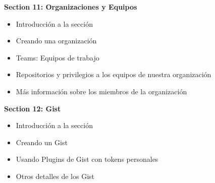 \documentclass[
]{book}
\providecommand{\tightlist}{%
  \setlength{\itemsep}{0pt}\setlength{\parskip}{0pt}}
\begin{document}
\textbf{Section 11: Organizaciones y Equipos}

\begin{itemize}
\tightlist
\item
  Introducción a la sección
\item
  Creando una organización
\item
  Teams: Equipos de trabajo
\item
  Repositorios y privilegios a los equipos de nuestra organización
\item
  Más información sobre los miembros de la organización
\end{itemize}

\textbf{Section 12: Gist}

\begin{itemize}
\tightlist
\item
  Introducción a la sección
\item
  Creando un Gist
\item
  Usando Plugins de Gist con tokens personales
\item
  Otros detalles de los Gist
\end{itemize}

  
\end{document}
